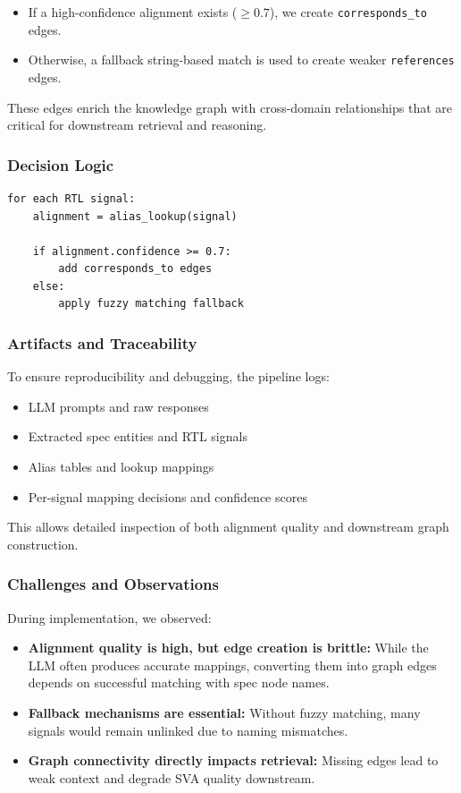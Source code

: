 \documentclass[12pt,a4paper]{article}
\begin{document}
\begin{itemize}[leftmargin=*]
  \item If a high-confidence alignment exists ($\geq 0.7$), we create
  \texttt{corresponds\_to} edges.
  \item Otherwise, a fallback string-based match is used to create weaker
  \texttt{references} edges.
\end{itemize}

These edges enrich the knowledge graph with cross-domain relationships that
are critical for downstream retrieval and reasoning.

\subsubsection{Decision Logic}

\begin{verbatim}
for each RTL signal:
    alignment = alias_lookup(signal)

    if alignment.confidence >= 0.7:
        add corresponds_to edges
    else:
        apply fuzzy matching fallback
\end{verbatim}

\subsubsection{Artifacts and Traceability}

To ensure reproducibility and debugging, the pipeline logs:

\begin{itemize}[leftmargin=*]
  \item LLM prompts and raw responses
  \item Extracted spec entities and RTL signals
  \item Alias tables and lookup mappings
  \item Per-signal mapping decisions and confidence scores
\end{itemize}

This allows detailed inspection of both alignment quality and downstream
graph construction.

\subsubsection{Challenges and Observations}

During implementation, we observed:

\begin{itemize}[leftmargin=*]
  \item \textbf{Alignment quality is high, but edge creation is brittle:}
  While the LLM often produces accurate mappings, converting them into graph
  edges depends on successful matching with spec node names.
  
  \item \textbf{Fallback mechanisms are essential:}
  Without fuzzy matching, many signals would remain unlinked due to naming
  mismatches.

  \item \textbf{Graph connectivity directly impacts retrieval:}
  Missing edges lead to weak context and degrade SVA quality downstream.
\end{itemize}
\end{document}
